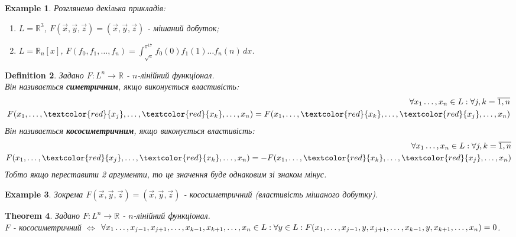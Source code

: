 \documentclass[a4paper, 10pt]{article}
\theoremstyle{theoremdd}
\newtheorem{theorem}{Theorem}[subsection]
\newtheorem{definition}[theorem]{Definition}
\newtheorem{example}[theorem]{Example}
\begin{document}
	\begin{example} Розглянемо декілька прикладів:
	\begin{enumerate}[nosep, wide=0pt, label={\arabic*.}]
	\item $L = \mathbb{R}^3$, \quad $F(\vec{x},\vec{y},\vec{z}) = (\vec{x}, \vec{y}, \vec{z})$ - мішаний добуток;
	\item $L = \mathbb{R}_n[x]$, \quad $F(f_0,f_1,\dots,f_n) = \displaystyle \int_{\sqrt{e}}^{\pi^{17}} f_0(0)f_1(1)\dots f_n(n) \,dx$.
	\end{enumerate}
	\end{example}
	
	\begin{definition}
	Задано $F \colon L^n \to \mathbb{R}$ - $n$-лінійний функціонал.\\
	Він називається \textbf{симетричним}, якщо виконується властивість:
	\begin{align*}
		\forall x_1 \dots, x_n \in L: \forall j,k = \overline{1,n}\\
	F(x_1, \dots, \textcolor{red}{x_j}, \dots, \textcolor{red}{x_k}, \dots, x_n) = F(x_1, \dots, \textcolor{red}{x_k}, \dots, \textcolor{red}{x_j}, \dots, x_n)
	\end{align*}
	Він називається \textbf{кососиметричним}, якщо виконується властивість:
	\begin{align*}
	\forall x_1 \dots, x_n \in L: \forall j,k = \overline{1,n}\\
	F(x_1, \dots, \textcolor{red}{x_j}, \dots, \textcolor{red}{x_k}, \dots, x_n) = -F(x_1, \dots, \textcolor{red}{x_k}, \dots, \textcolor{red}{x_j}, \dots, x_n)
	\end{align*}
	Тобто якщо переставити 2 аргументи, то це значення буде однаковим зі знаком мінус.
	\end{definition}
	
	\begin{example}
	Зокрема $F(\vec{x},\vec{y},\vec{z}) = (\vec{x}, \vec{y}, \vec{z})$ - кососиметричний (властивість мішаного добутку).
	\end{example}
	
	\begin{theorem}
	Задано $F \colon L^n \to \mathbb{R}$ - $n$-лінійний функціонал.\\
	$F$ - кососиметричний $\iff$ $\forall x_1 \dots, x_{j-1}, x_{j+1}, \dots, x_{k-1}, x_{k+1}, \dots, x_{n} \in L: \forall y \in L: \\ F(x_1,\dots, x_{j-1}, y, x_{j+1}, \dots, x_{k-1}, y, x_{k+1}, \dots, x_n) = 0$.
	\end{theorem}
	
\end{document}
